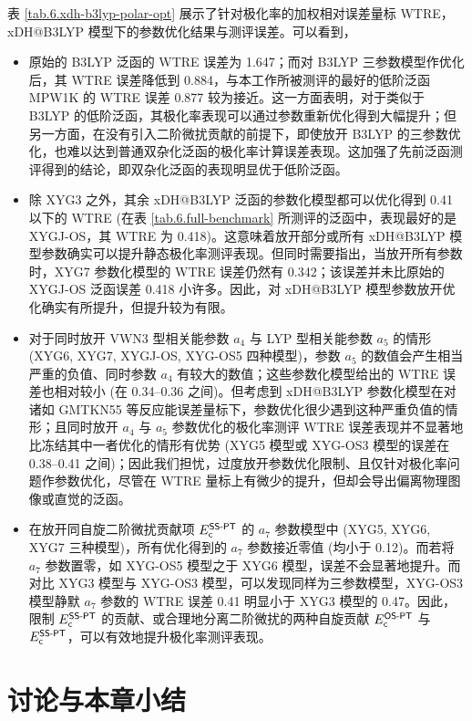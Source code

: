 表 \ref{tab.6.xdh-b3lyp-polar-opt} 展示了针对极化率的加权相对误差量标 WTRE，xDH@B3LYP 模型下的参数优化结果与测评误差。可以看到，
\begin{itemize}[nosep]
    \item 原始的 B3LYP 泛函的 WTRE 误差为 1.647；而对 B3LYP 三参数模型作优化后，其 WTRE 误差降低到 0.884，与本工作所被测评的最好的低阶泛函 MPW1K 的 WTRE 误差 0.877 较为接近。这一方面表明，对于类似于 B3LYP 的低阶泛函，其极化率表现可以通过参数重新优化得到大幅提升；但另一方面，在没有引入二阶微扰贡献的前提下，即使放开 B3LYP 的三参数优化，也难以达到普通双杂化泛函的极化率计算误差表现。这加强了先前泛函测评得到的结论，即双杂化泛函的表现明显优于低阶泛函。
    \item 除 XYG3 之外，其余 xDH@B3LYP 泛函的参数化模型都可以优化得到 0.41 以下的 WTRE (在表 \ref{tab.6.full-benchmark} 所测评的泛函中，表现最好的是 XYGJ-OS，其 WTRE 为 0.418)。这意味着放开部分或所有 xDH@B3LYP 模型参数确实可以提升静态极化率测评表现。但同时需要指出，当放开所有参数时，XYG7 参数化模型的 WTRE 误差仍然有 0.342；该误差并未比原始的 XYGJ-OS 泛函误差 0.418 小许多。因此，对 xDH@B3LYP 模型参数放开优化确实有所提升，但提升较为有限。
    \item 对于同时放开 VWN3 型相关能参数 $a_4$ 与 LYP 型相关能参数 $a_5$ 的情形 (XYG6, XYG7, XYGJ-OS, XYG-OS5 四种模型)，参数 $a_5$ 的数值会产生相当严重的负值、同时参数 $a_4$ 有较大的数值；这些参数化模型给出的 WTRE 误差也相对较小 (在 0.34--0.36 之间)。但考虑到 xDH@B3LYP 参数化模型在对诸如 GMTKN55 等反应能误差量标下，参数优化很少遇到这种严重负值的情形；且同时放开 $a_4$ 与 $a_5$ 参数优化的极化率测评 WTRE 误差表现并不显著地比冻结其中一者优化的情形有优势 (XYG5 模型或 XYG-OS3 模型的误差在 0.38--0.41 之间)；因此我们担忧，过度放开参数优化限制、且仅针对极化率问题作参数优化，尽管在 WTRE 量标上有微少的提升，但却会导出偏离物理图像或直觉的泛函。
    \item 在放开同自旋二阶微扰贡献项 $E_{\textsf{c}}^{\textsf{SS-PT}}$ 的 $a_7$ 参数模型中 (XYG5, XYG6, XYG7 三种模型)，所有优化得到的 $a_7$ 参数接近零值 (均小于 0.12)。而若将 $a_7$ 参数置零，如 XYG-OS5 模型之于 XYG6 模型，误差不会显著地提升。而对比 XYG3 模型与 XYG-OS3 模型，可以发现同样为三参数模型，XYG-OS3 模型静默 $a_7$ 参数的 WTRE 误差 0.41 明显小于 XYG3 模型的 0.47。因此，限制 $E_{\textsf{c}}^{\textsf{SS-PT}}$ 的贡献、或合理地分离二阶微扰的两种自旋贡献 $E_{\textsf{c}}^{\textsf{OS-PT}}$ 与 $E_{\textsf{c}}^{\textsf{SS-PT}}$，可以有效地提升极化率测评表现。
\end{itemize}

\section{讨论与本章小结}

